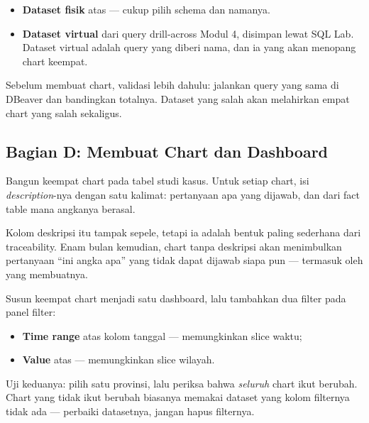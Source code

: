 \begin{itemize}
  \item \textbf{Dataset fisik} atas  ---
        cukup pilih schema dan namanya.
  \item \textbf{Dataset virtual} dari query drill-across Modul 4, disimpan
        lewat SQL Lab. Dataset virtual adalah query yang diberi nama, dan ia
        yang akan menopang chart keempat.
\end{itemize}

Sebelum membuat chart, validasi lebih dahulu: jalankan query yang sama di
DBeaver dan bandingkan totalnya. Dataset yang salah akan melahirkan empat chart
yang salah sekaligus.

\subsection{Bagian D: Membuat Chart dan Dashboard}


Bangun keempat chart pada tabel studi kasus. Untuk setiap chart, isi
\emph{description}-nya dengan satu kalimat: pertanyaan apa yang dijawab, dan
dari fact table mana angkanya berasal.

\begin{catatan}
Kolom deskripsi itu tampak sepele, tetapi ia adalah bentuk paling sederhana
dari traceability. Enam bulan kemudian, chart tanpa deskripsi akan menimbulkan
pertanyaan ``ini angka apa'' yang tidak dapat dijawab siapa pun --- termasuk
oleh yang membuatnya.
\end{catatan}


Susun keempat chart menjadi satu dashboard, lalu tambahkan dua filter pada
panel filter:

\begin{itemize}
  \item \textbf{Time range} atas kolom tanggal --- memungkinkan slice waktu;
  \item \textbf{Value} atas  --- memungkinkan slice wilayah.
\end{itemize}

Uji keduanya: pilih satu provinsi, lalu periksa bahwa \emph{seluruh} chart ikut
berubah. Chart yang tidak ikut berubah biasanya memakai dataset yang kolom
filternya tidak ada --- perbaiki datasetnya, jangan hapus filternya.

